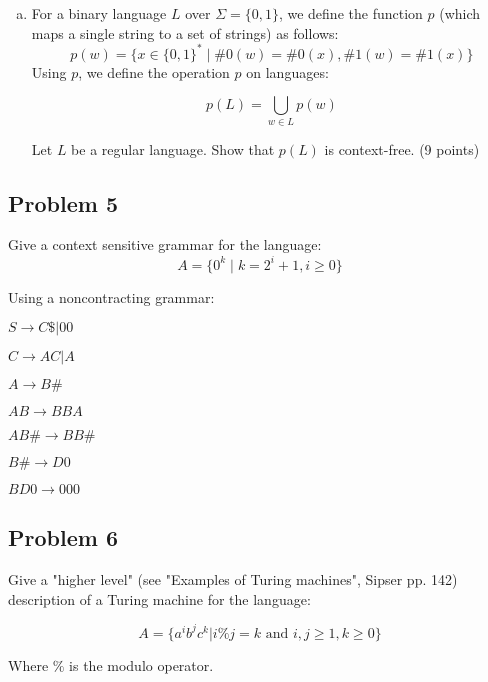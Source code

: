 \documentclass{article}
\begin{document}
\begin{enumerate}[(a)]
    \item For a binary language $L$ over $\Sigma=\{0,1\}$, we define the function $p$ (which
            maps a single string to a set of strings) as follows:
    \[p(w) = \{ x \in \{0,1\}^* \;|\; \#0(w) = \#0(x), \#1(w) = \#1(x) \}\]
    Using $p$, we define the operation $p$ on languages:

    \[p(L) = \bigcup\limits_{w \in L} p(w)\]

Let $L$ be a regular language.  Show that $p(L)$ is context-free. (9 points)
    \end{enumerate}
    \newpage
    \subsection*{Problem 5}

    Give a context sensitive grammar for the language:
    \[A = \{0^k \;|\; k = 2^i+1,i\ge0\}\]

Using a noncontracting grammar:

    $S \rightarrow C\$ | 00$

    $C \rightarrow AC | A$

    $A \rightarrow B\#$

    $AB \rightarrow BBA$

    $AB\# \rightarrow BB\#$

    $B\# \rightarrow D0$

    $BD0 \rightarrow 000$


    \newpage
    \subsection*{Problem 6}
    Give a "higher level" (see "Examples of Turing machines", Sipser pp. 142) description of a
    Turing machine for the language:

    \[A=\{a^ib^jc^k | i\%j=k \text{ and } i,j\ge1, k \geq 0\}\]

    Where $\%$ is the modulo operator.
\end{document}
